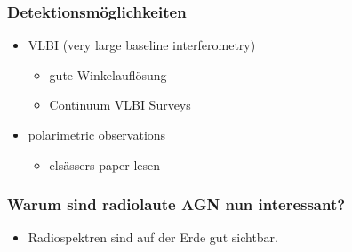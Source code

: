 \documentclass[aspectratio=1610, 9pt]{beamer}
\begin{document}
\begin{frame}\frametitle{Detektionsm\"oglichkeiten}
  \begin{itemize}
    \item VLBI (very large baseline interferometry)
    \begin{itemize}
      \item gute Winkelaufl\"osung
      \item Continuum VLBI Surveys
    \end{itemize}
    \item polarimetric observations
    \begin{itemize}
      \item els\"assers paper lesen
    \end{itemize}
  \end{itemize}
\end{frame}

\begin{frame}\frametitle{Warum sind radiolaute AGN nun interessant?}
  \begin{itemize}
    \item Radiospektren sind auf der Erde gut sichtbar.
  \end{itemize}
\end{frame}
\end{document}
